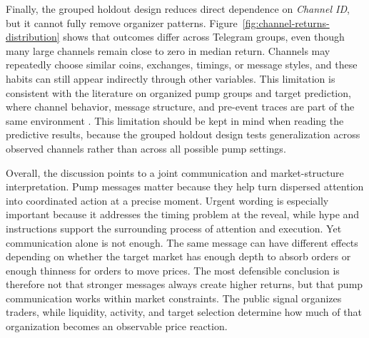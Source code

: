 Finally, the grouped holdout design reduces direct dependence on \textit{Channel ID}, but it cannot fully remove organizer patterns. Figure~\ref{fig:channel-returns-distribution} shows that outcomes differ across Telegram groups, even though many large channels remain close to zero in median return. Channels may repeatedly choose similar coins, exchanges, timings, or message styles, and these habits can still appear indirectly through other variables. This limitation is consistent with the literature on organized pump groups and target prediction, where channel behavior, message structure, and pre-event traces are part of the same environment \cite{hamrick2021examination, xu2019anatomy, lamorgia2023doge, hu2023sequence}. This limitation should be kept in mind when reading the predictive results, because the grouped holdout design tests generalization across observed channels rather than across all possible pump settings.

Overall, the discussion points to a joint communication and market-structure interpretation. Pump messages matter because they help turn dispersed attention into coordinated action at a precise moment. Urgent wording is especially important because it addresses the timing problem at the reveal, while hype and instructions support the surrounding process of attention and execution. Yet communication alone is not enough. The same message can have different effects depending on whether the target market has enough depth to absorb orders or enough thinness for orders to move prices. The most defensible conclusion is therefore not that stronger messages always create higher returns, but that pump communication works within market constraints. The public signal organizes traders, while liquidity, activity, and target selection determine how much of that organization becomes an observable price reaction.
